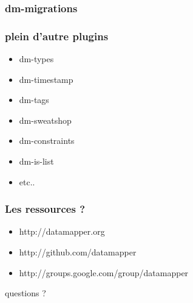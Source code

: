 \documentclass{beamer}
\begin{document}
\begin{frame}
    \frametitle{dm-migrations}

    \begin{center}
        
    \end{center}
\end{frame}

\begin{frame}
    \frametitle{plein d'autre plugins}

    \begin{itemize}
        \item dm-types
        \item dm-timestamp
        \item dm-tags
        \item dm-sweatshop
        \item dm-constraints
        \item dm-is-list
        \item etc..
    \end{itemize}

\end{frame}

\begin{frame}
    \frametitle{Les ressources ?}
    \begin{itemize}
        \item http://datamapper.org
        \item http://github.com/datamapper
        \item http://groups.google.com/group/datamapper
    \end{itemize}
\end{frame}

\begin{frame}
    \begin{center}
    \huge{}
    questions ?
    \end{center}
\end{frame}
\end{document}
